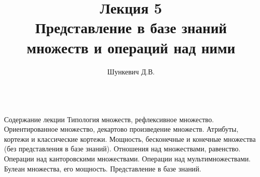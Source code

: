 \title{Лекция 5\\Представление в базе знаний множеств и операций над ними}   
\author[]{Шункевич Д.В.}

\begin{frame}
	\titlepage
\end{frame}

\begin{frame}{\\Содержание лекции}
	\topline
	\justifying
	Типология множеств, рефлексивное множество. Ориентированное множество, декартово произведение множеств. Атрибуты, кортежи и классические кортежи. Мощность, бесконечные и конечные множества (без представления в базе знаний). Отношения над множествами, равенство. Операции над канторовскими множествами. Операции над мультимножествами. Булеан множества, его мощность. Представление в базе знаний.
\end{frame}